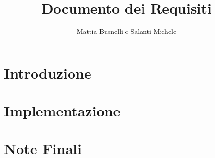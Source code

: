 \documentclass{report}
\title{Documento dei Requisiti}
\author{Mattia Busnelli e Salanti Michele}
\begin{document}


\renewcommand{\cftsecleader}{\cftdotfill{\cftdotsep}}
\tableofcontents


\chapter{Introduzione}


\chapter{Implementazione}


\chapter{Note Finali}




\end{document}
